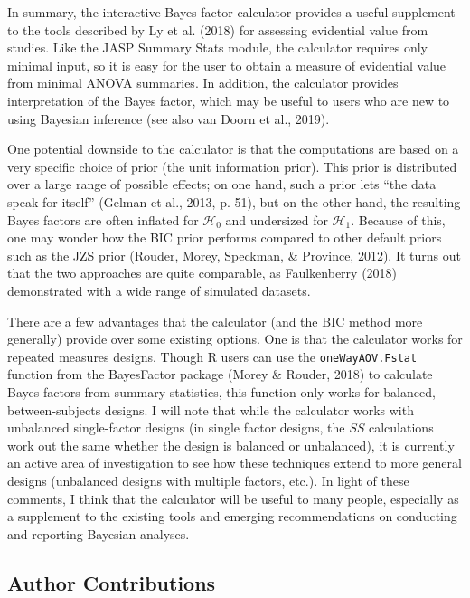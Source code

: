 \documentclass[doc]{apa6}
\begin{document}
In summary, the interactive Bayes factor calculator provides a useful supplement to the tools described by Ly et al. (2018) for assessing evidential value from studies. Like the JASP Summary Stats module, the calculator requires only minimal input, so it is easy for the user to obtain a measure of evidential value from minimal ANOVA summaries. In addition, the calculator provides interpretation of the Bayes factor, which may be useful to users who are new to using Bayesian inference (see also van Doorn et al., 2019).

One potential downside to the calculator is that the computations are based on a very specific choice of prior (the unit information prior). This prior is distributed over a large range of possible effects; on one hand, such a prior lets \enquote{the data speak for itself} (Gelman et al., 2013, p. 51), but on the other hand, the resulting Bayes factors are often inflated for \(\mathcal{H}_0\) and undersized for \(\mathcal{H}_1\). Because of this, one may wonder how the BIC prior performs compared to other default priors such as the JZS prior (Rouder, Morey, Speckman, \& Province, 2012). It turns out that the two approaches are quite comparable, as Faulkenberry (2018) demonstrated with a wide range of simulated datasets.

There are a few advantages that the calculator (and the BIC method more generally) provide over some existing options. One is that the calculator works for repeated measures designs. Though R users can use the \texttt{oneWayAOV.Fstat} function from the BayesFactor package (Morey \& Rouder, 2018) to calculate Bayes factors from summary statistics, this function only works for balanced, between-subjects designs. I will note that while the calculator works with unbalanced single-factor designs (in single factor designs, the \(SS\) calculations work out the same whether the design is balanced or unbalanced), it is currently an active area of investigation to see how these techniques extend to more general designs (unbalanced designs with multiple factors, etc.). In light of these comments, I think that the calculator will be useful to many people, especially as a supplement to the existing tools and emerging recommendations on conducting and reporting Bayesian analyses.

\subsection{Author Contributions}\label{author-contributions}
\end{document}
